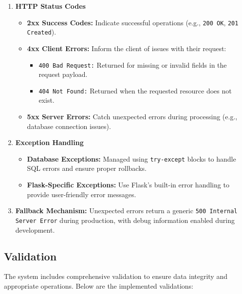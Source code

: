 \documentclass[a4paper,12pt]{article}
\begin{document}
\begin{enumerate}
    \item \textbf{HTTP Status Codes}
    \begin{itemize}
        \item \textbf{2xx Success Codes:} Indicate successful operations (e.g., \texttt{200 OK}, \texttt{201 Created}).
        \item \textbf{4xx Client Errors:} Inform the client of issues with their request:
        \begin{itemize}
            \item \texttt{400 Bad Request:} Returned for missing or invalid fields in the request payload.
            \item \texttt{404 Not Found:} Returned when the requested resource does not exist.
        \end{itemize}
        \item \textbf{5xx Server Errors:} Catch unexpected errors during processing (e.g., database connection issues).
    \end{itemize}

    \item \textbf{Exception Handling}
    \begin{itemize}
        \item \textbf{Database Exceptions:} Managed using \texttt{try-except} blocks to handle SQL errors and ensure proper rollbacks.
        \item \textbf{Flask-Specific Exceptions:} Use Flask’s built-in error handling to provide user-friendly error messages.
    \end{itemize}

    \item \textbf{Fallback Mechanism:} Unexpected errors return a generic \texttt{500 Internal Server Error} during production, with debug information enabled during development.
\end{enumerate}

\subsection{Validation}
The system includes comprehensive validation to ensure data integrity and appropriate operations. Below are the implemented validations:
\end{document}
